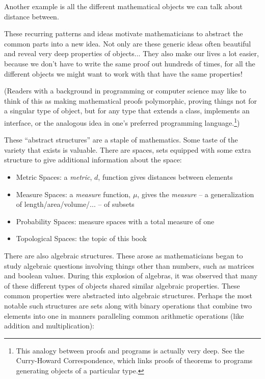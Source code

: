 \documentclass{report}
\begin{document}
Another example is all the different mathematical objects we can talk about distance between.

These recurring patterns and ideas motivate mathematicians to abstract the common parts into a new idea. Not only are these generic ideas often beautiful and reveal very deep properties of objects... They also make our lives a lot easier, because we don't have to write the same proof out hundreds of times, for all the different objects we might want to work with that have the same properties!

(Readers with a background in programming or computer science may like to think of this as making mathematical proofs polymorphic, proving things not for a singular type of object, but for any type that extends a class, implements an interface, or the analogous idea in one's preferred programming language.\footnote{This analogy between proofs and programs is actually very deep. See the Curry-Howard Correspondence, which links proofs of theorems to programs generating objects of a particular type.})

These ``abstract structures'' are a staple of mathematics. Some taste of the variety that exists is valuable. There are spaces, sets equipped with some extra structure to give additional information about the space:

\begin{itemize}
\item Metric Spaces: a \emph{metric}, $d$, function gives distances between elements
\item Measure Spaces: a \emph{measure} function, $\mu$, gives the \emph{measure} -- a generalization of length/area/volume/... -- of subsets
\item Probability Spaces: measure spaces with a total measure of one
\item Topological Spaces: the topic of this book
\end{itemize}

There are also algebraic structures. These arose as mathematicians began to study algebraic questions involving things other than numbers, such as matrices and boolean values. During this explosion of algebras, it was observed that many of these different types of objects shared similar algebraic properties. These common properties were abstracted into algebraic structures. Perhaps the most notable such structures are sets along with binary operations that combine two elements into one in manners paralleling common arithmetic operations (like addition and multiplication):
\end{document}
